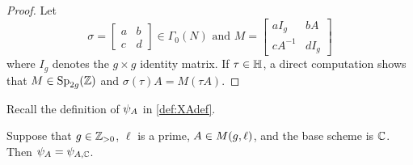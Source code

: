 \documentclass{amsart}
\begin{document}
\begin{proof}
Let
\[
\sigma = \begin{bmatrix} a & b \\ c & d \end{bmatrix} \in \Gamma_0(N) \text{ and } M = \begin{bmatrix} aI_g & bA \\ cA^{-1} & dI_g \end{bmatrix}
\]
where $I_g$ denotes the $g \times g$ identity matrix.
If $\tau \in \mathbb{H}$, a direct computation shows that $M \in\operatorname{Sp}_{2g}(\mathbb{Z})$
and  $\sigma(\tau)A = M(\tau A)$.
\end{proof}

Recall the definition of $\psi_{A}$ in \eqref{def:XAdef}.

\begin{lemma}\label{lemma:psimod-over-c}
Suppose that $g\in\mathbb{Z}_{>0}$, $\ell$ is a prime, $A \in M(g,\ell)$, and
 the base scheme is $\mathbb{C}$. Then $\psi_{A} = {\psi}_{A, \mathbb{C}}$.
\end{lemma}
\end{document}
